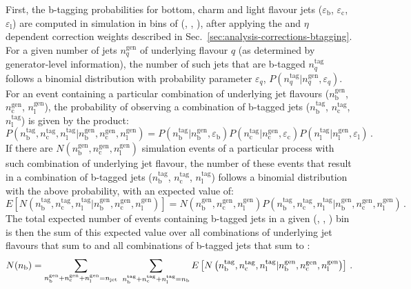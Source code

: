First, the b-tagging probabilities for bottom, charm and light flavour jets 
($\varepsilon_\mathrm b$, $\varepsilon_\mathrm c$, $\varepsilon_\mathrm l$) are 
computed in simulation in bins of (\nj, \scalht, \mht), after applying the \pt 
and $\eta$ dependent correction weights described in 
Sec.~\ref{sec:analysis-corrections-btagging}.
For a given number of jets $n_q^\mathrm{gen}$ of underlying flavour $q$ (as 
determined by generator-level information), the number of such jets that are 
b-tagged $n_q^\mathrm{tag}$ follows a binomial distribution with probability 
parameter $\varepsilon_q$, $P(n_q^\mathrm{tag}|n_q^\mathrm{gen}, 
\varepsilon_q)$. For an event containing a particular combination of 
underlying jet flavours ($n_\mathrm b^\mathrm{gen}$, $n_\mathrm 
c^\mathrm{gen}$, $n_\mathrm l^\mathrm{gen}$), the probability of observing a 
combination of b-tagged jets ($n_\mathrm b^\mathrm{tag}$, $n_\mathrm 
c^\mathrm{tag}$, $n_\mathrm l^\mathrm{tag}$) is given by the product:
\begin{equation}
P\left( n_\mathrm b^\mathrm{tag}, n_\mathrm c^\mathrm{tag}, n_\mathrm 
l^\mathrm{tag} | n_\mathrm b^\mathrm{gen}, n_\mathrm c^\mathrm{gen}, n_\mathrm 
l^\mathrm{gen} \right) = P\left(n_\mathrm b^\mathrm{tag}|n_\mathrm 
b^\mathrm{gen}, \varepsilon_\mathrm b\right) P\left(n_\mathrm 
c^\mathrm{tag}|n_\mathrm c^\mathrm{gen}, \varepsilon_\mathrm c\right) 
P\left(n_\mathrm l^\mathrm{tag}|n_\mathrm l^\mathrm{gen}, \varepsilon_\mathrm 
l\right) \, .
\end{equation}
If there are $N\left(n_\mathrm b^\mathrm{gen}, n_\mathrm 
c^\mathrm{gen}, n_\mathrm l^\mathrm{gen}\right)$ simulation events of a 
particular process with such 
combination of underlying jet flavour, the number of these events that result 
in a combination of b-tagged jets ($n_\mathrm b^\mathrm{tag}$, $n_\mathrm 
c^\mathrm{tag}$, $n_\mathrm l^\mathrm{tag}$) follows a binomial distribution 
with the above probability, with an expected value of:
\begin{equation}
E\left[N\left(n_\mathrm 
b^\mathrm{tag}, n_\mathrm c^\mathrm{tag}, n_\mathrm l^\mathrm{tag} | n_\mathrm 
b^\mathrm{gen}, n_\mathrm c^\mathrm{gen}, n_\mathrm l^\mathrm{gen}\right) 
\right] = N\left(n_\mathrm 
b^\mathrm{gen}, n_\mathrm c^\mathrm{gen}, n_\mathrm l^\mathrm{gen}\right) 
P\left( n_\mathrm b^\mathrm{tag}, n_\mathrm c^\mathrm{tag}, n_\mathrm 
l^\mathrm{tag} | n_\mathrm b^\mathrm{gen}, n_\mathrm c^\mathrm{gen}, n_\mathrm 
l^\mathrm{gen} \right) \, .
\end{equation}
The total expected number of events containing \nb b-tagged jets in a given 
(\njet, \scalht, \mht) bin is then the 
sum of this expected value over all combinations of underlying jet flavours 
that sum to \njet and all combinations of b-tagged jets that sum to \nb:
\begin{equation}
N(n_{\text{b}}) = \sum_{n_\mathrm b^\mathrm{gen} + n_\mathrm c^\mathrm{gen} + n_\mathrm 
l^\mathrm{gen} = n_{\text{jet}}} ~ \sum_{n_\mathrm b^\mathrm{tag} + n_\mathrm 
c^\mathrm{tag} + n_\mathrm l^\mathrm{tag} = n_{\text{b}}} E\left[N\left(n_\mathrm 
b^\mathrm{tag}, n_\mathrm c^\mathrm{tag}, n_\mathrm l^\mathrm{tag} | n_\mathrm 
b^\mathrm{gen}, n_\mathrm c^\mathrm{gen}, n_\mathrm l^\mathrm{gen}\right) 
\right] \, .
\end{equation}

